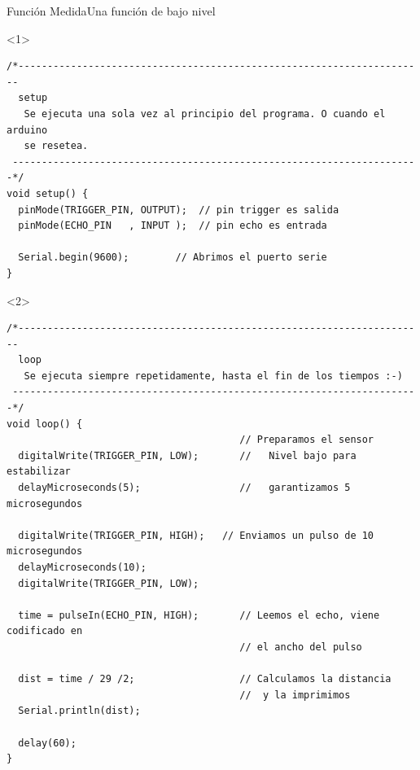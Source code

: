 \begin{frame}[fragile]{Función Medida}{Una función de bajo nivel}

  \begin{onlyenv}<1>
    \begin{lstlisting}
/*----------------------------------------------------------------------
  setup
   Se ejecuta una sola vez al principio del programa. O cuando el arduino
   se resetea.
 ----------------------------------------------------------------------*/
void setup() {
  pinMode(TRIGGER_PIN, OUTPUT);  // pin trigger es salida
  pinMode(ECHO_PIN   , INPUT );  // pin echo es entrada
  
  Serial.begin(9600);        // Abrimos el puerto serie
}
    \end{lstlisting}
  \end{onlyenv}

  \begin{onlyenv}<2>
  \begin{lstlisting}
/*----------------------------------------------------------------------
  loop
   Se ejecuta siempre repetidamente, hasta el fin de los tiempos :-)
 ----------------------------------------------------------------------*/
void loop() {
                                        // Preparamos el sensor
  digitalWrite(TRIGGER_PIN, LOW);       //   Nivel bajo para estabilizar
  delayMicroseconds(5);                 //   garantizamos 5 microsegundos
                                        
  digitalWrite(TRIGGER_PIN, HIGH);   // Enviamos un pulso de 10 microsegundos
  delayMicroseconds(10);
  digitalWrite(TRIGGER_PIN, LOW);
                                           
  time = pulseIn(ECHO_PIN, HIGH);       // Leemos el echo, viene codificado en
                                        // el ancho del pulso                 
  
  dist = time / 29 /2;                  // Calculamos la distancia
                                        //  y la imprimimos 
  Serial.println(dist);
  
  delay(60);
}
  \end{lstlisting}
    
  \end{onlyenv}


\end{frame}



